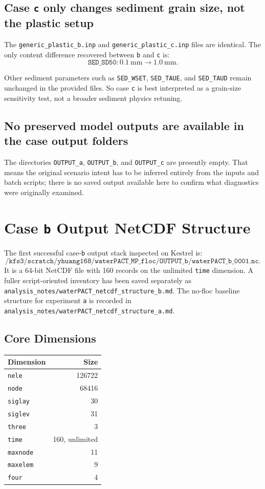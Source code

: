 \documentclass[11pt]{article}
\begin{document}
\subsection{Case \texttt{c} only changes sediment grain size, not the plastic setup}
The \texttt{generic\_plastic\_b.inp} and \texttt{generic\_plastic\_c.inp} files are identical. The only
content difference recovered between \texttt{b} and \texttt{c} is:
\[
\texttt{SED\_SD50}: 0.1\ \mathrm{mm} \rightarrow 1.0\ \mathrm{mm}.
\]

Other sediment parameters such as \texttt{SED\_WSET}, \texttt{SED\_TAUE}, and \texttt{SED\_TAUD} remain
unchanged in the provided files. So case \texttt{c} is best interpreted as a grain-size sensitivity test,
not a broader sediment physics retuning.

\subsection{No preserved model outputs are available in the case output folders}
The directories \texttt{OUTPUT\_a}, \texttt{OUTPUT\_b}, and \texttt{OUTPUT\_c} are presently empty. That means
the original scenario intent has to be inferred entirely from the inputs and batch scripts; there is no
saved output available here to confirm what diagnostics were originally examined.

\section{Case \texttt{b} Output NetCDF Structure}
The first successful case-\texttt{b} output stack inspected on Kestrel is:
\[
\texttt{/kfs3/scratch/yhuang168/waterPACT\_MP\_floc/OUTPUT\_b/waterPACT\_b\_0001.nc}.
\]
It is a 64-bit NetCDF file with 160 records on the unlimited \texttt{time} dimension. A fuller
script-oriented inventory has been saved separately as
\texttt{analysis\_notes/waterPACT\_netcdf\_structure\_b.md}. The no-floc baseline structure for
experiment \texttt{a} is recorded in
\texttt{analysis\_notes/waterPACT\_netcdf\_structure\_a.md}.

\subsection{Core Dimensions}
\begin{center}
\begin{tabular}{lr}
\toprule
Dimension & Size \\
\midrule
\texttt{nele} & 126722 \\
\texttt{node} & 68416 \\
\texttt{siglay} & 30 \\
\texttt{siglev} & 31 \\
\texttt{three} & 3 \\
\texttt{time} & 160, unlimited \\
\texttt{maxnode} & 11 \\
\texttt{maxelem} & 9 \\
\texttt{four} & 4 \\
\bottomrule
\end{tabular}
\end{center}
\end{document}
